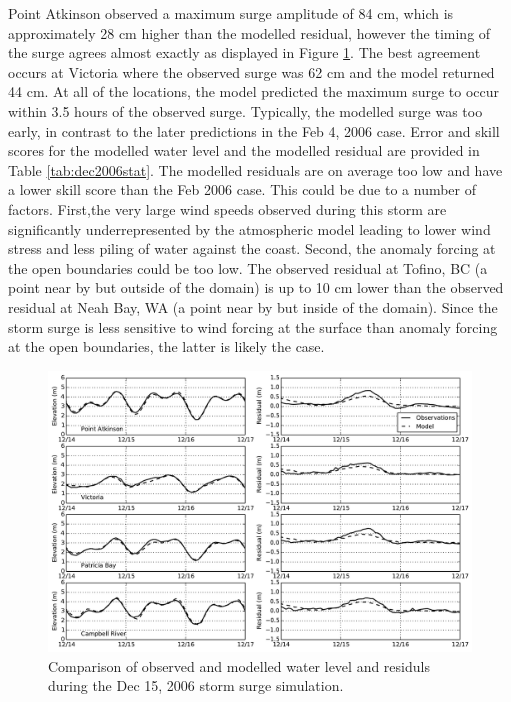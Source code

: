 \documentclass[pdftex,10pt]{article}
\begin{document}
Point Atkinson observed a maximum surge amplitude of 84 cm, which is approximately 28 cm higher than the modelled residual, however the timing of the surge agrees almost exactly as displayed in Figure \ref{fig:dec2006}. The best agreement occurs at Victoria where the observed surge was 62 cm and the model returned 44 cm. At all of the locations, the model predicted the maximum surge to occur within 3.5 hours of the observed surge. Typically, the modelled surge was too early, in contrast to the later predictions in the Feb 4, 2006 case. Error and skill scores for the modelled water level and the modelled residual are provided in Table \ref{tab:dec2006stat}. The modelled residuals are on average too low and have a lower skill score than the Feb 2006 case. This could be due to a number of factors. First,the very large wind speeds observed during this storm are significantly underrepresented by the atmospheric model leading to lower wind stress and less piling of water against the coast. Second, the anomaly forcing at the open boundaries could be too low. The observed residual at Tofino, BC (a point near by but outside of the domain) is up to 10 cm lower than the observed residual at Neah Bay, WA (a point near by but inside of the domain). Since the storm surge is less sensitive to wind forcing at the surface than anomaly forcing at the open boundaries, the latter is likely the case. 

\begin{figure}
\centering
\includegraphics[scale=0.6]{Figures/dec2006.pdf}
\caption{Comparison of observed and modelled water level and residuls during the Dec 15, 2006 storm surge simulation. }
\label{fig:dec2006}
\end{figure}%
\end{document}

